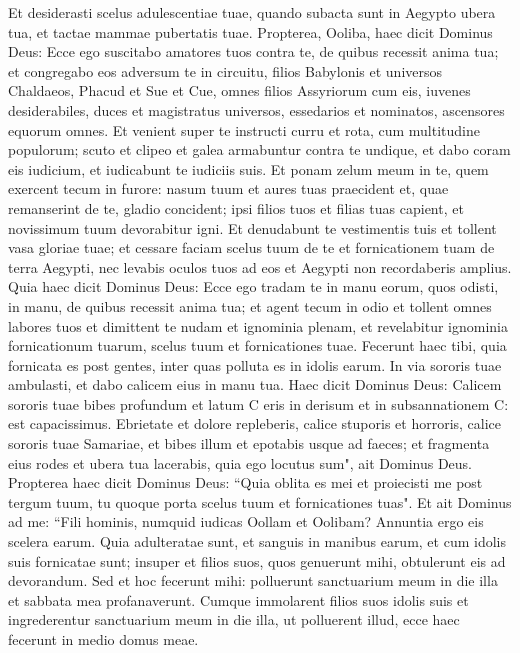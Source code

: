 \begin{biblechapter}
\verse Et desiderasti scelus adulescentiae tuae, quando subacta sunt in Aegypto ubera tua, et tactae mammae pubertatis tuae. 
\verse Propterea, Ooliba, haec dicit Dominus Deus: Ecce ego suscitabo amatores tuos contra te, de quibus recessit anima tua; et congregabo eos adversum te in circuitu, 
\verse filios Babylonis et universos Chaldaeos, Phacud et Sue et Cue, omnes filios Assyriorum cum eis, iuvenes desiderabiles, duces et magistratus universos, essedarios et nominatos, ascensores equorum omnes. 
\verse Et venient super te instructi curru et rota, cum multitudine populorum; scuto et clipeo et galea armabuntur contra te undique, et dabo coram eis iudicium, et iudicabunt te iudiciis suis. 
\verse Et ponam zelum meum in te, quem exercent tecum in furore: nasum tuum et aures tuas praecident et, quae remanserint de te, gladio concident; ipsi filios tuos et filias tuas capient, et novissimum tuum devorabitur igni. 
\verse Et denudabunt te vestimentis tuis et tollent vasa gloriae tuae; 
\verse et cessare faciam scelus tuum de te et fornicationem tuam de terra Aegypti, nec levabis oculos tuos ad eos et Aegypti non recordaberis amplius. 
\verse Quia haec dicit Dominus Deus: Ecce ego tradam te in manu eorum, quos odisti, in manu, de quibus recessit anima tua; 
\verse et agent tecum in odio et tollent omnes labores tuos et dimittent te nudam et ignominia plenam, et revelabitur ignominia fornicationum tuarum, scelus tuum et fornicationes tuae.  
\verse Fecerunt haec tibi, quia fornicata es post gentes, inter quas polluta es in idolis earum. 
\verse In via sororis tuae ambulasti, et dabo calicem eius in manu tua. 
\verse Haec dicit Dominus Deus: Calicem sororis tuae bibes profundum et latum C eris in derisum et in subsannationem C: est capacissimus. 
\verse Ebrietate et dolore repleberis, calice stuporis et horroris, calice sororis tuae Samariae, 
\verse et bibes illum et epotabis usque ad faeces; et fragmenta eius rodes et ubera tua lacerabis, quia ego locutus sum", ait Dominus Deus. 
\verse Propterea haec dicit Dominus Deus: “Quia oblita es mei et proiecisti me post tergum tuum, tu quoque porta scelus tuum et fornicationes tuas". 
\verse Et ait Dominus ad me: “Fili hominis, numquid iudicas Oollam et Oolibam? Annuntia ergo eis scelera earum. 
\verse Quia adulteratae sunt, et sanguis in manibus earum, et cum idolis suis fornicatae sunt; insuper et filios suos, quos genuerunt mihi, obtulerunt eis ad devorandum. 
\verse Sed et hoc fecerunt mihi: polluerunt sanctuarium meum in die illa et sabbata mea profanaverunt. 
\verse Cumque immolarent filios suos idolis suis et ingrederentur sanctuarium meum in die illa, ut polluerent illud, ecce haec fecerunt in medio domus meae. 

\end{biblechapter}
